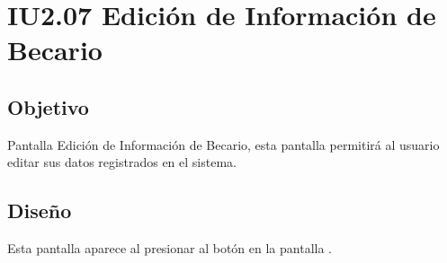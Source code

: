 \newpage
\section{IU2.07 Edición de Información de Becario}

\subsection{Objetivo}
	Pantalla Edición de Información de Becario, esta pantalla permitirá al usuario editar sus datos registrados en el sistema.
	


\subsection{Diseño}
	Esta pantalla aparece al presionar al botón  en la pantalla  .

	
